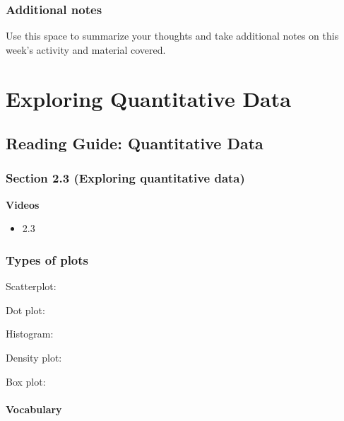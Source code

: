 \documentclass[
]{report}
\providecommand{\tightlist}{%
  \setlength{\itemsep}{0pt}\setlength{\parskip}{0pt}}
\newcommand{\rgs}{\vspace{12pt}} %
\begin{document}
\newpage

\hypertarget{additional-notes-2}{%
\subsection{Additional notes}\label{additional-notes-2}}

Use this space to summarize your thoughts and take additional notes on this week's activity and material covered.

\hypertarget{exploring-quantitative-data}{%
\chapter{Exploring Quantitative Data}\label{exploring-quantitative-data}}

\hypertarget{reading-guide-quantitative-data}{%
\section{Reading Guide: Quantitative Data}\label{reading-guide-quantitative-data}}

\hypertarget{section-2.3-exploring-quantitative-data}{%
\subsection*{Section 2.3 (Exploring quantitative data)}\label{section-2.3-exploring-quantitative-data}}

\textbf{Videos}

\begin{itemize}
\tightlist
\item
  2.3
\end{itemize}


\hypertarget{types-of-plots}{%
\subsection*{Types of plots}\label{types-of-plots}}

Scatterplot:
\rgs

Dot plot:
\rgs

Histogram:
\rgs

Density plot:
\rgs

Box plot:
\rgs

\hypertarget{vocabulary-5}{%
\subsubsection*{Vocabulary}\label{vocabulary-5}}
\end{document}
